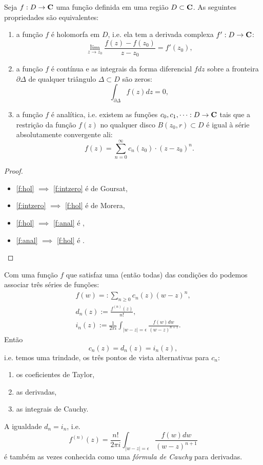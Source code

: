 \begin{teorema}
\label{t:criterio}
Seja $f: D \to \mathbf{C}$ uma função definida em uma região $D\subset \mathbf{C}$. 
As seguintes propriedades são equivalentes:
\begin{enumerate}
\item \label{f:hol}
a função $f$ é holomorfa em $D$, i.e. ela tem a derivada complexa $f' : D \to \mathbf{C}$:
\[ \lim_{z\to z_0} \frac{f(z)-f(z_0)}{z-z_0} = f'(z_0), \]
\item \label{f:intzero}
a função $f$ é contínua e as integrais da forma diferencial $f dz$
sobre a fronteira $\partial \Delta$
de qualquer triângulo $\Delta \subset D$ são zeros: 
\[ \int_{\partial \Delta} f(z) dz = 0 , \]
\item \label{f:anal}
a função $f$ é analítica, i.e. existem as funções $c_0,c_1,\dots: D\to\mathbf{C}$ tais que
a restrição da função $f(z)$ no qualquer disco $B(z_0,r) \subset D$
é igual à série absolutamente convergente ali:
\[ f(z) = \sum_{n=0}^\infty c_n(z_0) \cdot (z-z_0)^n. \]
\end{enumerate}
\end{teorema}
\begin{proof}
\begin{itemize}
\item \eqref{f:hol} $\implies$ \eqref{f:intzero} é  de Goursat,
\item \eqref{f:intzero} $\implies$ \eqref{f:hol} é  de Morera,
\item \eqref{f:hol} $\implies$ \eqref{f:anal} é ,
\item \eqref{f:anal} $\implies$ \eqref{f:hol} é .
\end{itemize}
\end{proof}

\begin{remark}
Com uma função $f$ que satisfaz uma (então todas) das condições do 
podemos associar três séries de funções:
\begin{align*}
f(w) =: \sum_{n\geq 0} c_n(z) (w-z)^n,\\
d_n(z) := \frac{f^{(n)}(z)}{n!},\\
i_n(z) := \frac{1}{2\pi i} \int_{|w-z|=\epsilon} \frac{f(w)dw}{(w-z)^{n+1}}.
\end{align*}
Então
\[ c_n(z) = d_n(z) = i_n(z), \]
i.e. temos uma trindade, os três pontos de vista alternativas para $c_n$:
\begin{enumerate}
\item os coeficientes de Taylor,
\item as derivadas,
\item as integrais de Cauchy.
\end{enumerate}
A igualdade $d_n = i_n$, i.e.
\begin{equation}
\label{eq:formula-cauchy}
f^{(n)}(z) = \frac{n!}{2\pi i} \int_{|w-z|=\epsilon} \frac{f(w)dw}{(w-z)^{n+1}}
\end{equation}
é também as vezes conhecida como uma \emph{fórmula de Cauchy} para derivadas.
\end{remark}

